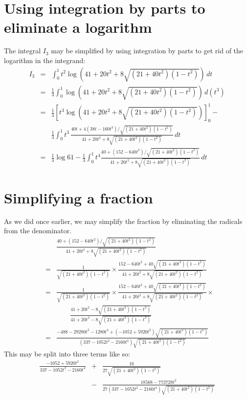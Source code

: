 \documentclass[12pt]{article}
\begin{document}
\section{Using integration by parts to eliminate a logarithm}

The integral $I_3$ may be simplified by using integration by parts to get rid of the logarithm in the integrand:
\begin{eqnarray*}
I_3 &=& \int_0^1 t^2 \log \left( 41 + 20 t^2 + 8\sqrt{(21 + 40 t^2) (1 - t^2)}\right) \, dt \\ 
&=& \frac{1}{3} \int_0^1 \log\left( 41 + 20 t^2 + 8\sqrt{(21 + 40 t^2) (1 - t^2)} \right) \, d(t^3) \\
&=& \frac{1}{3} \left[ t^3 \log\left( 41 + 20 t^2 + 8\sqrt{(21 + 40 t^2) (1 - t^2)} \right) \right]_0^1 - \\ &&
\frac{1}{3} \int_0^1 t^3 \, \frac{40 t + 4 (38 t - 160 t^3) / \sqrt{(21 + 40 t^2) (1 - t^2)}}{41 + 20 t^2 + 8\sqrt{(21 + 40 t^2) (1 - t^2)}} \, dt \\
&=& \frac{1}{3} \log 61 - \frac{1}{3} \int_0^1 t^4 \frac{40 + (152 - 640 t^2) / \sqrt{(21 + 40 t^2) (1 - t^2)}}{41 + 20 t^2 + 8\sqrt{(21 + 40 t^2) (1 - t^2)}}  \, dt
\end{eqnarray*}

\section{Simplifying a fraction}

As we did once earlier, we may simplify the fraction by eliminating the radicals from the denominator.
\begin{eqnarray*}
&& \frac{40 + (152 - 640 t^2) / \sqrt{(21 + 40 t^2) (1 - t^2)}}{41 + 20 t^2 + 8\sqrt{(21 + 40 t^2) (1 - t^2)}}  \\
&=& \frac{1}{\sqrt{(21 + 40 t^2) (1 - t^2)}} \times \frac{152 - 640 t^2 + 40 \sqrt{(21 + 40 t^2) (1 - t^2)}}{41 + 20 t^2 + 8\sqrt{(21 + 40 t^2) (1 - t^2)}} \\
&=& \frac{1}{\sqrt{(21 + 40 t^2) (1 - t^2)}} \times 
\frac{152 - 640 t^2 + 40 \sqrt{(21 + 40 t^2) (1 - t^2)}}{41 + 20 t^2 + 8\sqrt{(21 + 40 t^2) (1 - t^2)}} \times \\
&& \qquad \frac{41 + 20 t^2 - 8\sqrt{(21 + 40 t^2) (1 - t^2)}}{41 + 20 t^2 - 8\sqrt{(21 + 40 t^2) (1 - t^2)}} \\
&=& \frac{-488 - 29280 t^2 - 1280 t^4 + (-1052 + 5920 t^2)
\sqrt{(21 + 40 t^2) (1 - t^2)}}{(337 - 1052 t^2 - 2160 t^4) \sqrt{(21 + 40 t^2) (1 - t^2)}}
\end{eqnarray*}
This may be split into three terms like so:
\begin{eqnarray*}
\frac{-1052 + 5920 t^2}{337 - 1052 t^2 - 2160 t^4} &+& \frac{16}{27 
\sqrt{(21 + 40 t^2) (1 - t^2)}} \\ &-& \frac{18568 - 773728 t^2}
{27 (337 - 1052 t^2 - 2160 t^4) \sqrt{(21 + 40 t^2) (1 - t^2)}}
\end{eqnarray*}
\end{document}

